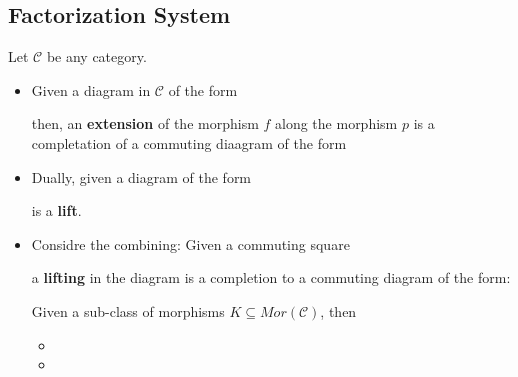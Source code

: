 \documentclass[Total.tex]{subfiles}
\begin{document}
			\subsection{Factorization System}
			\begin{Def}
				Let $\mathcal{C}$ be any category. 
				\begin{itemize}
					\item Given a diagram in $\mathcal{C}$ of the form
					\begin{center}
					\end{center}
					then, an \textbf{extension} of the morphism $f$ along the morphism $p$ is a completation of a commuting diaagram of the form
					\begin{center}
					\end{center}
					\item Dually, given a diagram of the form
					\begin{center}
					\end{center}
					is a \textbf{lift}.
					\item Considre the combining: Given a commuting square
					\begin{center}
					\end{center}
					a \textbf{lifting} in the diagram is a completion to a commuting diagram of the form:
					\begin{center}
					\end{center}
					Given a sub-class of morphisms $K\subseteq Mor(\mathcal{C})$, then
					\begin{itemize}
						\item 
						\item 
					\end{itemize}
				\end{itemize}
			\end{Def}
\end{document}
